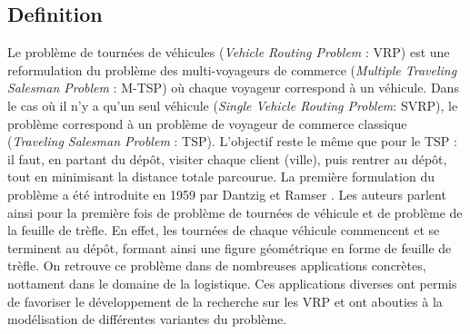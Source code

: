 \label{sec:vrp}


\subsection{Definition}
Le problème de tournées de véhicules (\textit{Vehicle Routing Problem} : VRP) est une reformulation du problème des multi-voyageurs de commerce (\textit{Multiple Traveling Salesman Problem} : M-TSP) où chaque voyageur correspond à un véhicule. Dans le cas où il n'y a qu'un seul véhicule (\textit{Single Vehicle Routing Problem}: SVRP), le problème correspond à un problème de voyageur de commerce classique (\textit{Traveling Salesman Problem} : TSP).
L'objectif reste le même que pour le TSP : il faut, en partant du dépôt, visiter chaque client (ville), puis rentrer au dépôt, tout en minimisant la distance totale parcourue. La première formulation du problème a été introduite en 1959 par Dantzig et Ramser \cite{Dantzig1959}. Les auteurs parlent ainsi pour la première fois de problème de tournées de véhicule et de problème de la feuille de trèfle. En effet, les tournées de chaque véhicule commencent et se terminent au dépôt, formant ainsi une figure géométrique en forme de feuille de trèfle.
On retrouve ce problème dans de nombreuses applications concrètes, nottament dans le domaine de la logistique. Ces applications diverses ont permis de favoriser le développement de la recherche sur les VRP et ont abouties à la modélisation de différentes variantes du problème.\\

